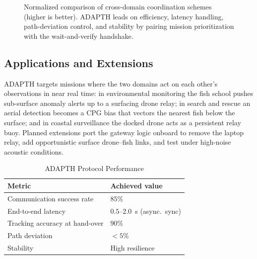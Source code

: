 \documentclass[journal]{IEEEtran}
\begin{document}
\begin{figure}[!t]
\centering
{}
\caption{Normalized comparison of cross-domain coordination schemes (higher is
better). ADAPTH leads on efficiency, latency handling, path-deviation control, and
stability by pairing mission prioritization with the wait-and-verify handshake.}
\label{fig:adapth_bench}
\end{figure}

\subsection{Applications and Extensions}
ADAPTH targets missions where the two domains act on each other's observations in
near real time: in environmental monitoring the fish school pushes sub-surface
anomaly alerts up to a surfacing drone relay; in search and rescue an aerial
detection becomes a CPG bias that vectors the nearest fish below the surface; and in
coastal surveillance the docked drone acts as a persistent relay buoy. Planned
extensions port the gateway logic onboard to remove the laptop relay, add
opportunistic surface drone--fish links, and test under high-noise acoustic
conditions.

\begin{table}[!t]
\centering
\caption{ADAPTH Protocol Performance}
\label{tab:adapth}
\begin{tabular}{ll}
\toprule
Metric & Achieved value\\
\midrule
Communication success rate     & $85\%$\\
End-to-end latency             & $0.5$--$2.0$~s (async.\ sync)\\
Tracking accuracy at hand-over & $90\%$\\
Path deviation                 & $<5\%$\\
Stability                      & High resilience\\
\bottomrule
\end{tabular}
\end{table}
\end{document}
